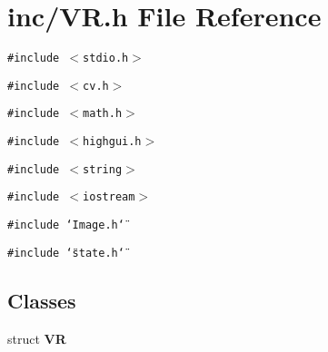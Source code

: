 \section{inc/VR.h File Reference}
\label{VR_8h}
{\tt \#include $<$stdio.h$>$}\par
{\tt \#include $<$cv.h$>$}\par
{\tt \#include $<$math.h$>$}\par
{\tt \#include $<$highgui.h$>$}\par
{\tt \#include $<$string$>$}\par
{\tt \#include $<$iostream$>$}\par
{\tt \#include \char`\"{}Image.h\char`\"{}}\par
{\tt \#include \char`\"{}state.h\char`\"{}}\par
\subsection*{Classes}
\begin{CompactItemize}
\item 
struct {\bf VR}
\end{CompactItemize}
